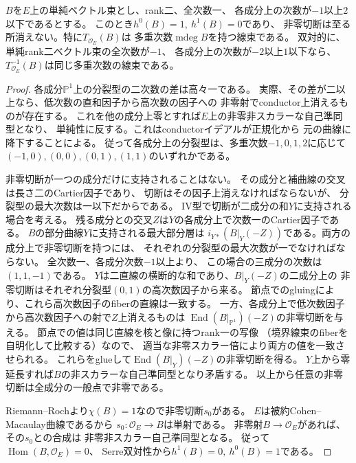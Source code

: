 \begin{lemma}[rank二の評価写像]
\label{lem:ou-additive-rank-two-evaluation}
$B$を$E$上の単純ベクトル束とし、rank二、全次数一、
各成分上の次数が$-1$以上$2$以下であるとする。
このとき$h^0(B)=1,\ h^1(B)=0$であり、
非零切断は至る所消えない。特に$T_{\mathcal O_E}(B)$は
多重次数$\operatorname{mdeg}B$を持つ線束である。
双対的に、単純rank二ベクトル束の全次数が$-1$、
各成分上の次数が$-2$以上$1$以下なら、
$T_{\mathcal O_E}^{-1}(B)$は同じ多重次数の線束である。
\end{lemma}
\begin{proof}
各成分$\mathbb P^1$上の分裂型の二次数の差は高々一である。
実際、その差が二以上なら、低次数の直和因子から高次数の因子への
非零射でconductor上消えるものが存在する。
これを他の成分上零とすれば$E$上の非零非スカラーな自己準同型となり、
単純性に反する。これはconductorイデアルが正規化から
元の曲線に降下することによる。
従って各成分上の分裂型は、多重次数$-1,0,1,2$に応じて
$(-1,0),(0,0),(0,1),(1,1)$のいずれかである。

非零切断が一つの成分だけに支持されることはない。
その成分と補曲線の交叉は長さ二のCartier因子であり、
切断はその因子上消えなければならないが、
分裂型の最大次数は一以下だからである。
IV型で切断が二成分の和$Y$に支持される場合を考える。
残る成分との交叉$Z$は$Y$の各成分上で次数一のCartier因子である。
$B$の部分曲線$Y$に支持される最大部分層は
$i_{Y*}(B|_Y(-Z))$である。両方の成分上で非零切断を持つには、
それぞれの分裂型の最大次数が一でなければならない。
全次数一、各成分次数$-1$以上より、
この場合の三成分の次数は$(1,1,-1)$である。
$Y$は二直線の横断的な和であり、$B|_Y(-Z)$の二成分上の
非零切断はそれぞれ分裂型$(0,1)$の高次数因子から来る。
節点でのgluingにより、これら高次数因子のfiberの直線は一致する。
一方、各成分上で低次数因子から高次数因子への射で$Z$上消えるものは
$\operatorname{End}(B|_{\mathbb P^1})(-Z)$の非零切断を与える。
節点での値は同じ直線を核と像に持つrank一の写像
（境界線束のfiberを自明化して比較する）なので、
適当な非零スカラー倍により両方の値を一致させられる。
これらをglueして$\operatorname{End}(B|_Y)(-Z)$の非零切断を得る。
$Y$上から零延長すれば$B$の非スカラーな自己準同型となり矛盾する。
以上から任意の非零切断は全成分の一般点で非零である。

Riemann--Rochより$\chi(B)=1$なので非零切断$s_0$がある。
$E$は被約Cohen--Macaulay曲線であるから
$s_0:\mathcal O_E\to B$は単射である。
非零射$B\to\mathcal O_E$があれば、その$s_0$との合成は
非零非スカラー自己準同型となる。
従って$\operatorname{Hom}(B,\mathcal O_E)=0$、
Serre双対性から$h^1(B)=0,\ h^0(B)=1$である。


\end{proof}
